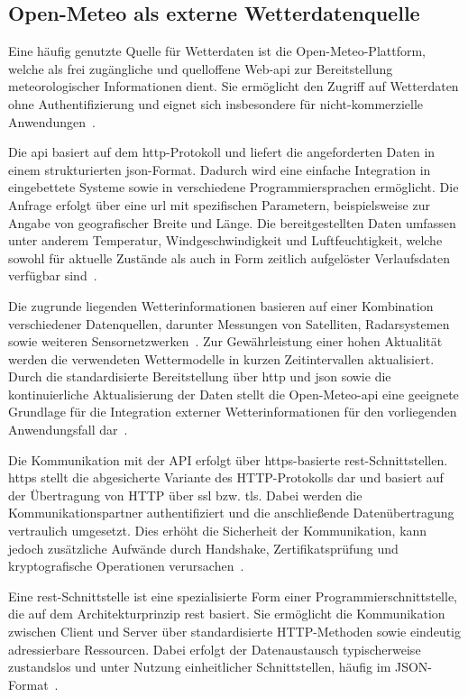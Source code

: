 \subsection{Open-Meteo als externe Wetterdatenquelle}
Eine häufig genutzte Quelle für Wetterdaten ist die Open-Meteo-Plattform, welche als frei zugängliche und quelloffene Web-\gls{api} zur Bereitstellung meteorologischer Informationen dient. 
Sie ermöglicht den Zugriff auf Wetterdaten ohne Authentifizierung und eignet sich insbesondere für nicht-kommerzielle Anwendungen~\cite{openmeteo}.

Die \gls{api} basiert auf dem \gls{http}-Protokoll und liefert die angeforderten Daten in einem strukturierten \gls{json}-Format. 
Dadurch wird eine einfache Integration in eingebettete Systeme sowie in verschiedene Programmiersprachen ermöglicht. 
Die Anfrage erfolgt über eine \gls{url} mit spezifischen Parametern, beispielsweise zur Angabe von geografischer Breite und Länge. 
Die bereitgestellten Daten umfassen unter anderem Temperatur, Windgeschwindigkeit und Luftfeuchtigkeit, welche sowohl für aktuelle Zustände als auch in Form zeitlich aufgelöster Verlaufsdaten verfügbar sind~\cite{openmeteo}.

Die zugrunde liegenden Wetterinformationen basieren auf einer Kombination verschiedener Datenquellen, darunter Messungen von Satelliten, Radarsystemen sowie weiteren Sensornetzwerken~\cite{openmeteo}. 
Zur Gewährleistung einer hohen Aktualität werden die verwendeten Wettermodelle in kurzen Zeitintervallen aktualisiert.
Durch die standardisierte Bereitstellung über \gls{http} und \gls{json} sowie die kontinuierliche Aktualisierung der Daten stellt die Open-Meteo-\gls{api} eine geeignete Grundlage für die Integration externer Wetterinformationen für den vorliegenden Anwendungsfall dar~\cite{openmeteo}.

Die Kommunikation mit der API erfolgt über \gls{https}-basierte \gls{rest}-Schnittstellen. 
\gls{https} stellt die abgesicherte Variante des HTTP-Protokolls dar und basiert auf der Übertragung von HTTP über \gls{ssl} bzw. \gls{tls}. 
Dabei werden die Kommunikationspartner authentifiziert und die anschließende Datenübertragung vertraulich umgesetzt. 
Dies erhöht die Sicherheit der Kommunikation, kann jedoch zusätzliche Aufwände durch Handshake, Zertifikatsprüfung und kryptografische Operationen verursachen~\cite{naylor2014https}.

Eine \gls{rest}-Schnittstelle ist eine spezialisierte Form einer Programmierschnittstelle, die auf dem Architekturprinzip \gls{rest} basiert.
Sie ermöglicht die Kommunikation zwischen Client und Server über standardisierte HTTP-Methoden sowie eindeutig adressierbare Ressourcen.
Dabei erfolgt der Datenaustausch typischerweise zustandslos und unter Nutzung einheitlicher Schnittstellen, häufig im JSON-Format~\cite{RESTAPI}.